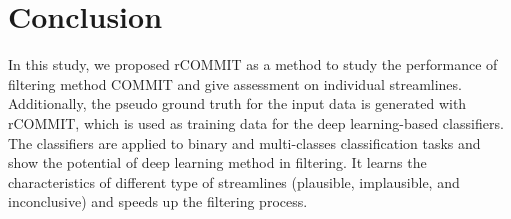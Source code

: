 \chapter{Conclusion}
In this study, we proposed rCOMMIT as a method to study the performance of 
filtering method COMMIT and give assessment on individual streamlines. 
Additionally, the pseudo ground truth for the input data is generated with rCOMMIT, which 
is used as training data for the deep learning-based classifiers.
The classifiers are applied to binary and multi-classes classification tasks and 
show the potential of deep learning method in filtering. 
It learns the characteristics of different type of streamlines (plausible, implausible, and inconclusive) 
and speeds up the filtering process.  
